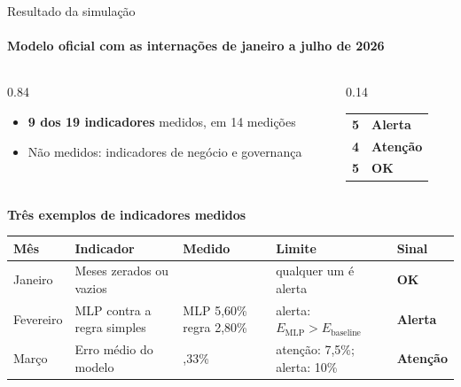 \documentclass[aspectratio=169,10pt]{beamer}
\newcommand{\chave}[1]{\textcolor{dcblue}{\textbf{#1}}}
\newcommand{\ok}{\textcolor{nivelok}{\textbf{OK}}}
\newcommand{\atencao}{\textcolor{nivelatencao}{\textbf{Atenção}}}
\newcommand{\alerta}{\textcolor{nivelalerta}{\textbf{Alerta}}}
\begin{document}
\begin{frame}[t]{Resultado da simulação}
  \framesubtitle{Modelo oficial com as internações de janeiro a julho de 2026}
  \begin{columns}[T,onlytextwidth]
    \begin{column}[T]{0.84\textwidth}
      \vspace{0pt}
      \footnotesize
      \setlength{\leftmargini}{0.9em}
      \begin{itemize}
        \setlength{\itemsep}{2pt}
        \item \chave{9 dos 19 indicadores} medidos, em 14 medições
        \item Não medidos: indicadores de negócio e governança
      \end{itemize}
    \end{column}
    \begin{column}[T]{0.14\textwidth}
      \vspace{0pt}
      \small
      \begin{tabular}{@{}rl@{}}
        \textbf{5} & \alerta \\
        \textbf{4} & \atencao \\
        \textbf{5} & \ok \\
      \end{tabular}
    \end{column}
  \end{columns}
  \vspace{0.05cm}
  {\color{uelgreen}\small\textbf{Três exemplos de indicadores medidos}}\par
  \vspace{0.1cm}
  \footnotesize
  \renewcommand{\arraystretch}{1.15}
  \setlength{\tabcolsep}{4pt}
  \begin{tabular}{@{}>{\raggedright\arraybackslash}p{}>{\raggedright\arraybackslash}p{}>{\raggedright\arraybackslash}p{}>{\raggedright\arraybackslash}p{}>{\raggedright\arraybackslash}p{}@{}}
    \toprule
    \textbf{Mês} & \textbf{Indicador} & \textbf{Medido} & \textbf{Limite} & \textbf{Sinal} \\
    \midrule
    Janeiro & Meses zerados ou vazios & 0 & qualquer um é alerta & \ok \\
    Fevereiro & MLP contra a regra simples & MLP 5,60\% \newline regra 2,80\% & alerta: $E_{\text{MLP}} > E_{\text{baseline}}$ & \alerta \\
    Março & Erro médio do modelo & 9,33\% & atenção: 7,5\%; alerta: 10\% & \atencao \\

\end{tabular}
\end{frame}
\end{document}
